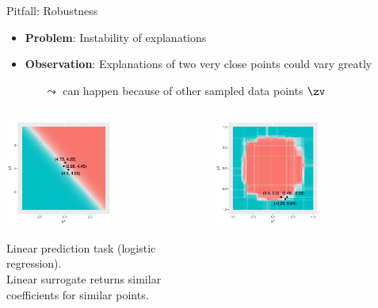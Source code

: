 \documentclass[11pt,compress,t,notes=noshow, aspectratio=169, xcolor=table]{beamer}
\begin{document}
\begin{frame}[c]{Pitfall: Robustness }
\begin{itemize}
	\item \textbf{Problem}: Instability of explanations 
	\item \textbf{Observation}: Explanations of two very close points could vary greatly 
	\begin{itemize}
	    \item[$\leadsto$] can happen because of other sampled data points $\zv$
	\end{itemize}
\end{itemize}
\vspace{-0.7cm}
\begin{columns}
	\begin{column}{0.48\textwidth}
		\begin{center}
		
		\includegraphics[width=0.55\textwidth]{figure/lime_robustness_1.png}
		
		{Linear prediction task (logistic regression). \\Linear surrogate returns similar coefficients for similar points.}
		
		\end{center}
	\end{column}
	\begin{column}{0.48\textwidth}
		\begin{center}
	\includegraphics[width=0.55\textwidth]{figure/lime_robustness_2.png}
	

\end{center}
\end{column}
\end{columns}
\end{frame}
\end{document}

